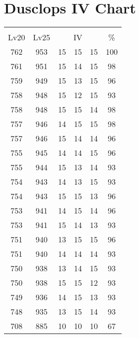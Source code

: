 \documentclass{article}%
\begin{document}
%
\normalsize%
\section{Dusclops IV Chart}%
\label{sec:Dusclops IV Chart}%
\renewcommand{\arraystretch}{1.5}%
\begin{tabular}{|c|c|c|c|c|c|}%
\hline%
\multicolumn{6}{|c|}{\textcolor{white}{ 
\linebreak{Dusclops}
}%
\cellcolor{black}}\\%
\multicolumn{1}{|c}{Lv20}&\multicolumn{1}{c|}{Lv25}&\multicolumn{3}{c|}{IV}&\multicolumn{1}{|c|}{\%}\\%
\hline%
\rowcolor{color100}%
762&953&15&15&15&100\\%
\hline%
\rowcolor{color98}%
761&951&15&14&15&98\\%
\hline%
\rowcolor{color96}%
759&949&15&13&15&96\\%
\hline%
\rowcolor{color93}%
758&948&15&12&15&93\\%
\hline%
\rowcolor{color98}%
758&948&15&15&14&98\\%
\hline%
\rowcolor{color98}%
757&946&14&15&15&98\\%
\hline%
\rowcolor{color96}%
757&946&15&14&14&96\\%
\hline%
\rowcolor{color96}%
755&945&14&14&15&96\\%
\hline%
\rowcolor{color93}%
755&944&15&13&14&93\\%
\hline%
\rowcolor{color93}%
754&943&14&13&15&93\\%
\hline%
\rowcolor{color96}%
754&943&15&15&13&96\\%
\hline%
\rowcolor{color96}%
753&941&14&15&14&96\\%
\hline%
\rowcolor{color93}%
753&941&15&14&13&93\\%
\hline%
\rowcolor{color96}%
751&940&13&15&15&96\\%
\hline%
\rowcolor{color93}%
751&940&14&14&14&93\\%
\hline%
\rowcolor{color93}%
750&938&13&14&15&93\\%
\hline%
\rowcolor{color93}%
750&938&15&15&12&93\\%
\hline%
\rowcolor{color93}%
749&936&14&15&13&93\\%
\hline%
\rowcolor{color93}%
748&935&13&15&14&93\\%
\hline%
\rowcolor{color91}%
708&885&10&10&10&67\\%
\end{tabular}

%
\end{document}
